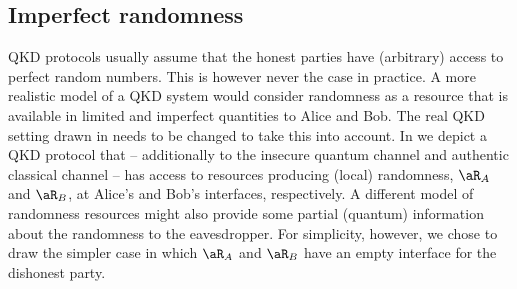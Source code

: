 \subsection{Imperfect randomness}
\label{sec:alternative.randomness}

QKD protocols usually assume that the honest parties have (arbitrary) access to perfect random numbers. This is however never the case in practice. A more realistic model of a QKD system would consider randomness as a resource that is available in limited and imperfect quantities to Alice and Bob. The real QKD setting drawn in  needs to be changed to take this into account. In  we depict a QKD protocol that \--- additionally to the insecure quantum channel and authentic classical channel \--- has access to resources producing (local) randomness, $\aR_A$ and $\aR_B$, at Alice's and Bob's interfaces, respectively. A different model of randomness resources might also provide some partial (quantum) information about the randomness to the eavesdropper. For simplicity, however, we chose to draw the simpler case in which $\aR_A$ and $\aR_B$ have an empty interface for the dishonest party.

